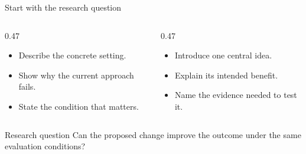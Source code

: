 \documentclass[aspectratio=169,10pt]{beamer}
\begin{document}
\begin{frame}[plain]
  \titlepage
\end{frame}

\begin{frame}{Start with the research question}
  \begin{columns}[t,onlytextwidth]
    \begin{column}{0.47\textwidth}
      \begin{itemize}
        \item Describe the concrete setting.
        \item Show why the current approach fails.
        \item State the condition that matters.
      \end{itemize}
    \end{column}
    \begin{column}{0.47\textwidth}
      \begin{itemize}
        \item Introduce one central idea.
        \item Explain its intended benefit.
        \item Name the evidence needed to test it.
      \end{itemize}
    \end{column}
  \end{columns}
  \vspace{0.8em}
  \begin{block}{Research question}
    Can the proposed change improve the outcome under the same evaluation conditions?
  \end{block}
\end{frame}
\end{document}
